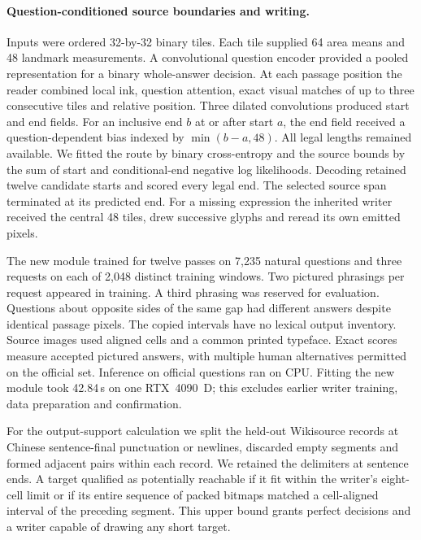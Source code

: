 \paragraph{Question-conditioned source boundaries and writing.}
Inputs were ordered 32-by-32 binary tiles. Each tile supplied 64 area means and 48 landmark measurements. A convolutional question encoder provided a pooled representation for a binary whole-answer decision. At each passage position the reader combined local ink, question attention, exact visual matches of up to three consecutive tiles and relative position. Three dilated convolutions produced start and end fields. For an inclusive end $b$ at or after start $a$, the end field received a question-dependent bias indexed by $\min(b-a,48)$. All legal lengths remained available. We fitted the route by binary cross-entropy and the source bounds by the sum of start and conditional-end negative log likelihoods. Decoding retained twelve candidate starts and scored every legal end. The selected source span terminated at its predicted end. For a missing expression the inherited writer received the central 48 tiles, drew successive glyphs and reread its own emitted pixels.

The new module trained for twelve passes on 7,235 natural questions and three requests on each of 2,048 distinct training windows. Two pictured phrasings per request appeared in training. A third phrasing was reserved for evaluation. Questions about opposite sides of the same gap had different answers despite identical passage pixels. The copied intervals have no lexical output inventory. Source images used aligned cells and a common printed typeface. Exact scores measure accepted pictured answers, with multiple human alternatives permitted on the official set. Inference on official questions ran on CPU. Fitting the new module took 42.84\,s on one RTX~4090~D; this excludes earlier writer training, data preparation and confirmation.

For the output-support calculation we split the held-out Wikisource records at Chinese sentence-final punctuation or newlines, discarded empty segments and formed adjacent pairs within each record. We retained the delimiters at sentence ends. A target qualified as potentially reachable if it fit within the writer's eight-cell limit or if its entire sequence of packed bitmaps matched a cell-aligned interval of the preceding segment. This upper bound grants perfect decisions and a writer capable of drawing any short target.
